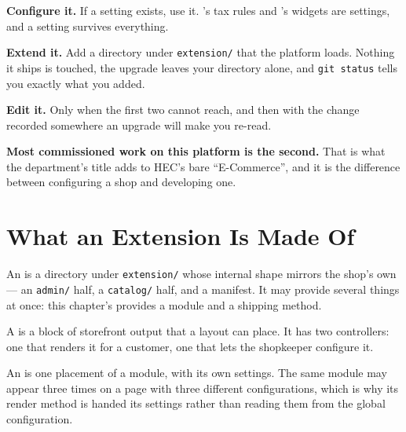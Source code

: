 \begin{conceptbox}
\begin{tightnum}
  \item \textbf{Configure it.} If a setting exists, use it.
        's tax rules and 's widgets are
        settings, and a setting survives everything.
  \item \textbf{Extend it.} Add a directory under \texttt{extension/} that the
        platform loads. Nothing it ships is touched, the upgrade leaves your
        directory alone, and \texttt{git status} tells you exactly what you
        added.
  \item \textbf{Edit it.} Only when the first two cannot reach, and then with
        the change recorded somewhere an upgrade will make you re-read.
\end{tightnum}

\smallskip
\textbf{Most commissioned work on this platform is the second.} That is what
the department's title adds to HEC's bare ``E-Commerce'', and it is the
difference between configuring a shop and developing one.
\end{conceptbox}

\section{What an Extension Is Made Of}

\begin{definitionbox}
An  is a directory under \texttt{extension/} whose internal
shape mirrors the shop's own --- an \texttt{admin/} half, a \texttt{catalog/}
half, and a manifest. It may provide several things at once: this chapter's
provides a module and a shipping method.

\smallskip
A  is a block of storefront output that a layout can place. It
has two controllers: one that renders it for a customer, one that lets the
shopkeeper configure it.

\smallskip
An  is one placement of a module, with its own settings. The
same module may appear three times on a page with three different
configurations, which is why its render method is handed its settings rather
than reading them from the global configuration.
\end{definitionbox}

